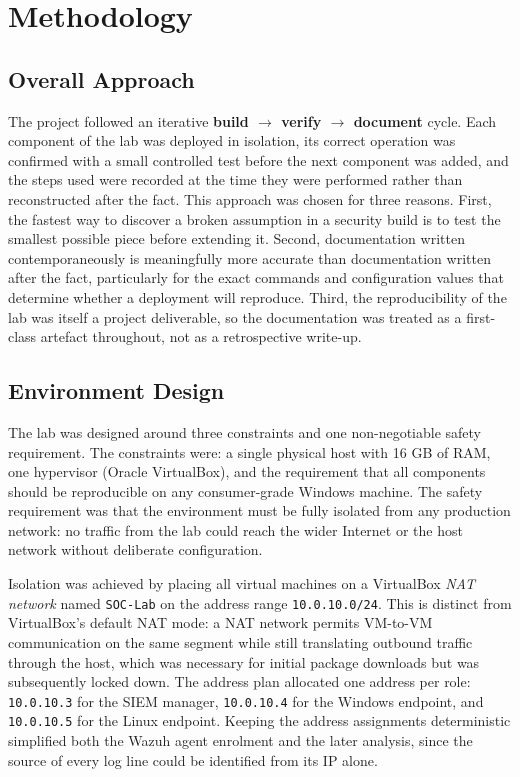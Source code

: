 \section{Methodology}
\label{sec:methodology}

\subsection{Overall Approach}

The project followed an iterative \textbf{build $\rightarrow$ verify $\rightarrow$
document} cycle. Each component of the lab was deployed in isolation, its
correct operation was confirmed with a small controlled test before the next
component was added, and the steps used were recorded at the time they were
performed rather than reconstructed after the fact. This approach was chosen
for three reasons. First, the fastest way to discover a broken assumption in a
security build is to test the smallest possible piece before extending it.
Second, documentation written contemporaneously is meaningfully more accurate
than documentation written after the fact, particularly for the exact commands
and configuration values that determine whether a deployment will reproduce.
Third, the reproducibility of the lab was itself a project deliverable, so the
documentation was treated as a first-class artefact throughout, not as a
retrospective write-up.

\subsection{Environment Design}
\label{sec:env-design}

The lab was designed around three constraints and one non-negotiable safety
requirement. The constraints were: a single physical host with 16 GB of RAM,
one hypervisor (Oracle VirtualBox), and the requirement that all components
should be reproducible on any consumer-grade Windows machine. The safety
requirement was that the environment must be fully isolated from any
production network: no traffic from the lab could reach the wider Internet or
the host network without deliberate configuration.

Isolation was achieved by placing all virtual machines on a VirtualBox
\textit{NAT network} named \texttt{SOC-Lab} on the address range
\texttt{10.0.10.0/24}. This is distinct from VirtualBox's default NAT
mode: a NAT network permits VM-to-VM communication on the same segment while
still translating outbound traffic through the host, which was necessary for
initial package downloads but was subsequently locked down. The address plan
allocated one address per role: \texttt{10.0.10.3} for the SIEM manager,
\texttt{10.0.10.4} for the Windows endpoint, and \texttt{10.0.10.5} for the
Linux endpoint. Keeping the address assignments deterministic simplified both
the Wazuh agent enrolment and the later analysis, since the source of every
log line could be identified from its IP alone.

